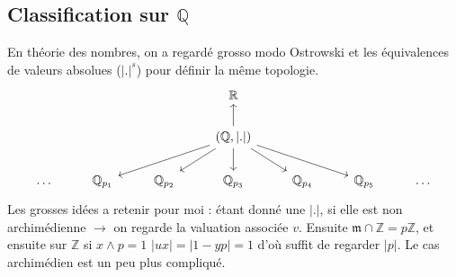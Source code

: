 \documentclass[a4paper,12pt]{book}
\newcommand{\Z}{\mathbb{Z}}
\newcommand{\Q}{\mathbb{Q}}
\newcommand{\m}{\mathfrak m}
\theoremstyle{plain}
\theoremstyle{definition}
\theoremstyle{remark}
\begin{document}
\subsection*{Classification sur $\Q$}
En théorie des nombres, on a regardé grosso modo Ostrowski et les 
équivalences de valeurs absolues ($|.|^s$) pour définir la même 
topologie.
\[\begin{tikzcd}
	&&& {\mathbb R} \\
	&&& {(\mathbb Q,|.|)} \\
	\ldots & {\mathbb Q_{p_1}} & {\mathbb Q_{p_2}} & {\mathbb Q_{p_3}} & {\mathbb Q_{p_4}} & {\mathbb Q_{p_5}} & \ldots
	\arrow[from=2-4, to=1-4]
	\arrow[from=2-4, to=3-2]
	\arrow[from=2-4, to=3-3]
	\arrow[from=2-4, to=3-4]
	\arrow[from=2-4, to=3-5]
	\arrow[from=2-4, to=3-6]
\end{tikzcd}\]
Les grosses idées a retenir pour moi : étant donné une $|.|$, si
elle est non archimédienne $\to$ on regarde la valuation associée $v$. 
Ensuite $\m\cap \Z=p\Z$, et ensuite sur $\Z$ si $x\wedge p=1$
$|ux|=|1-yp|=1$ d'où suffit de regarder $|p|$. Le cas archimédien est 
un peu plus compliqué.
\end{document}
